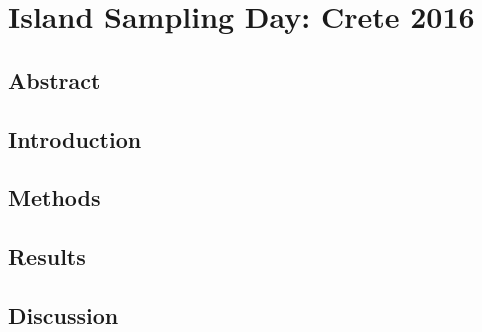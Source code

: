 % 
% 


\chapter{Island Sampling Day: Crete 2016}
\label{cha:isd-crete}


%



\section{Abstract}

\section{Introduction}
\label{sec:isd-intro}

\section{Methods}
\label{sec:isd-method}

\section{Results}
\label{sec:isd-results}

\section{Discussion}
\label{sec:isd-discussion}

